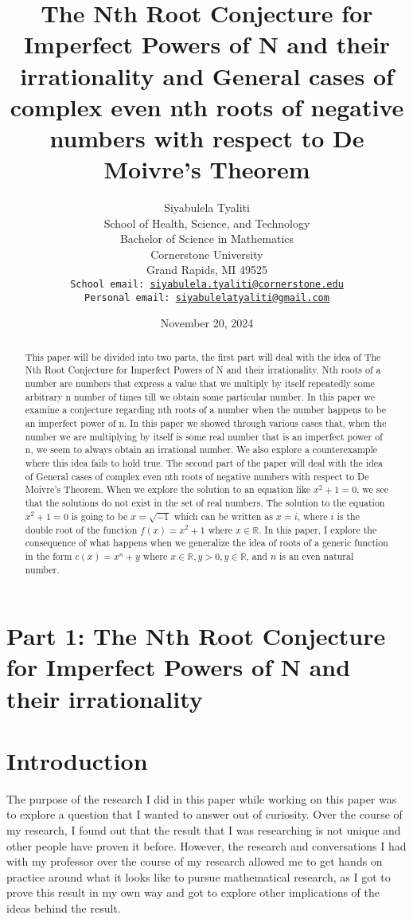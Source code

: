 \documentclass{turabian-researchpaper}
\title{The Nth Root Conjecture for Imperfect Powers of N and their irrationality and General cases of complex even nth roots of negative numbers with respect to De Moivre's Theorem}
\author{
 Siyabulela Tyaliti \\
  School of Health, Science, and Technology \\
  Bachelor of Science in Mathematics \\ 
  Cornerstone University \\
  Grand Rapids, MI 49525 \\
  \texttt{School email: \href{mailto:siyabulela.tyaliti@cornerstone.edu} {siyabulela.tyaliti@cornerstone.edu}} \\ 
  \texttt{Personal email: \href{mailto:siyabulelatyaliti@gmail.com}{siyabulelatyaliti@gmail.com}} \\ 
}
\date{November 20, 2024}
\begin{document}
   \maketitle
   \begin{abstract} 
This paper will be divided into two parts, the first part will deal with the idea of The Nth Root Conjecture for Imperfect Powers of N and their irrationality. Nth roots of a number are numbers that express a value that we multiply by itself repeatedly some arbitrary n number of times till we obtain some particular number. In this paper we examine a conjecture regarding nth roots of a number when the number happens to be an imperfect power of n. In this paper we showed through various cases that, when the number we are multiplying by itself is some real number that is an imperfect power of n, we seem to always obtain an irrational number. We also explore a counterexample where this idea fails to hold true.
The second part of the paper will deal with the idea of General cases of complex even nth roots of negative numbers with respect to De Moivre's Theorem. When we explore the solution to an equation like \(x^2+1=0\), we see that the solutions do not exist in the set of real numbers. The solution to the equation \(x^2 + 1 = 0\) is going to be \(x = \sqrt{-1}\) which can be written as \(x = i\), where \(i\) is the double root of the function \(f(x) = x^2 + 1\) where \(x \in \mathds{R}\). In this paper, I explore the consequence of what happens when we generalize the idea of roots of a generic function in the form \(c(x) = x^n + y\) where \(x \in \mathds{R}, y > 0, y \in \mathds{R}\), and \(n\) is an even natural number. 
\end{abstract}



\section*{Part 1: The Nth Root Conjecture for Imperfect Powers of N and their irrationality} 

\section{Introduction}
The purpose of the research I did in this paper while working on this paper was to explore a question that I wanted to answer out of curiosity. Over the course of my research, I found out that the result that I was researching is not unique and other people have proven it before. However, the research and conversations I had with my professor over the course of my research allowed me to get hands on practice around what it looks like to pursue mathematical research, as I got to prove this result in my own way and got to explore other implications of the ideas behind the result.  
\end{document}
